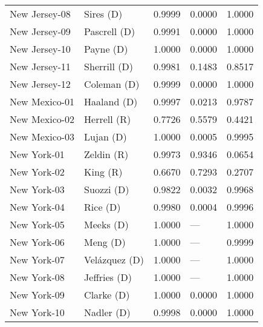 \begin{longtable}{llrll}
     New Jersey-08 &            {\color{Blue} Sires (D)} &       0.9999 &        0.0000 &        1.0000 \\
     New Jersey-09 &         {\color{Blue} Pascrell (D)} &       0.9991 &        0.0000 &        1.0000 \\
     New Jersey-10 &            {\color{Blue} Payne (D)} &       1.0000 &        0.0000 &        1.0000 \\
     New Jersey-11 &         {\color{Blue} Sherrill (D)} &       0.9981 &        0.1483 &        0.8517 \\
     New Jersey-12 &          {\color{Blue} Coleman (D)} &       0.9999 &        0.0000 &        1.0000 \\
     New Mexico-01 &          {\color{Blue} Haaland (D)} &       0.9997 &        0.0213 &        0.9787 \\
     New Mexico-02 &           {\color{Red} Herrell (R)} &       0.7726 &        0.5579 &        0.4421 \\
     New Mexico-03 &            {\color{Blue} Lujan (D)} &       1.0000 &        0.0005 &        0.9995 \\
       New York-01 &            {\color{Red} Zeldin (R)} &       0.9973 &        0.9346 &        0.0654 \\
       New York-02 &              {\color{Red} King (R)} &       0.6670 &        0.7293 &        0.2707 \\
       New York-03 &           {\color{Blue} Suozzi (D)} &       0.9822 &        0.0032 &        0.9968 \\
       New York-04 &             {\color{Blue} Rice (D)} &       0.9980 &        0.0004 &        0.9996 \\
       New York-05 &            {\color{Blue} Meeks (D)} &       1.0000 &           --- &        1.0000 \\
       New York-06 &             {\color{Blue} Meng (D)} &       1.0000 &           --- &        0.9999 \\
       New York-07 &        {\color{Blue} Velázquez (D)} &       1.0000 &           --- &        1.0000 \\
       New York-08 &         {\color{Blue} Jeffries (D)} &       1.0000 &           --- &        1.0000 \\
       New York-09 &           {\color{Blue} Clarke (D)} &       1.0000 &        0.0000 &        1.0000 \\
       New York-10 &           {\color{Blue} Nadler (D)} &       0.9998 &        0.0000 &        1.0000 \\

\end{longtable}
